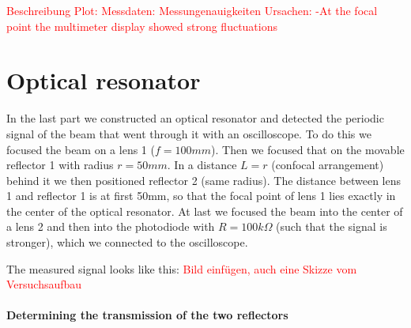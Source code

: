 \documentclass{article}
\begin{document}
\textcolor{red}{
Beschreibung Plot:
Messdaten:
Messungenauigkeiten Ursachen:
-At the focal point the multimeter display showed strong fluctuations}

\section{Optical resonator}

In the last part we constructed an optical resonator and detected the periodic signal of the beam that went through it with an oscilloscope. To do this we focused the beam on a lens 1 ($f=100mm$). Then we focused that on the movable reflector 1 with radius $r = 50mm$. In a distance $L=r$ (confocal arrangement) behind it we then positioned reflector 2 (same radius). The distance between lens 1 and reflector 1 is at first 50mm, so that the focal point of lens 1 lies exactly in the center of the optical resonator. At last we focused the beam into the center of a lens 2 and then into the photodiode with $R=100k\Omega$ (such that the signal is stronger), which we connected to the oscilloscope.

The measured signal looks like this:
\textcolor{red}{Bild einfügen, auch eine Skizze vom Versuchsaufbau}

\paragraph{Determining the transmission of the two reflectors}
\end{document}
